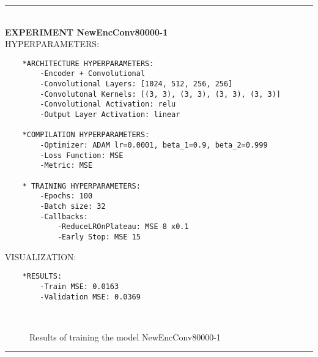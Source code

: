\rule{0.5\textwidth}{0.5pt}\\

	{\large \textbf{EXPERIMENT NewEncConv80000-1}}\\
	
	{\normalsize HYPERPARAMETERS:}
	\begin{lstlisting}	
	*ARCHITECTURE HYPERPARAMETERS:
		-Encoder + Convolutional
		-Convolutional Layers: [1024, 512, 256, 256]
		-Convolutonal Kernels: [(3, 3), (3, 3), (3, 3), (3, 3)]
		-Convolutional Activation: relu
		-Output Layer Activation: linear
	
	*COMPILATION HYPERPARAMETERS:
		-Optimizer: ADAM lr=0.0001, beta_1=0.9, beta_2=0.999
		-Loss Function: MSE
		-Metric: MSE
	
	* TRAINING HYPERPARAMETERS:
		-Epochs: 100
		-Batch size: 32
		-Callbacks:
			-ReduceLROnPlateau: MSE 8 x0.1
			-Early Stop: MSE 15
	\end{lstlisting}
	
	{\normalsize VISUALIZATION:}
	\begin{lstlisting}
	*RESULTS:
        -Train MSE: 0.0163
        -Validation MSE: 0.0369
	\end{lstlisting}
	
	\begin{figure*}[ht!]
		\hspace{\fill}
		\hspace{\fill}
		\\
		\caption{Results of training the model NewEncConv80000-1}
	\end{figure*}
	
\FloatBarrier	
\rule{0.5\textwidth}{0.5pt}\\